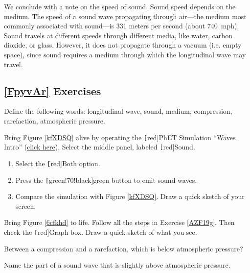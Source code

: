 \documentclass[main.tex]{subfiles}
\begin{document}
We conclude with a note on the speed of sound. Sound speed depends on the medium. The speed of a sound wave propagating through air---the medium most commonly associated with sound---is 331 meters per second (about \SI{740}{mph}). Sound travels at different speeds through different media, like water, carbon dioxide, or glass. However, it does not propagate through a vacuum (i.e. empty space), since sound requires a medium through which the longitudinal wave may travel.

\subsection*{\ref{FpyvAr} Exercises}

\begin{exercise}
    Define the following words: longitudinal wave, sound, medium, compression, rarefaction, atmospheric pressure. 
\end{exercise}

\begin{exercise} \label{AZF19g}
     Bring Figure \ref{kfXDSQ} alive by operating the \texttt[red]{PhET Simulation} ``Waves Intro'' (\href{https://phet.colorado.edu/sims/html/waves-intro/latest/waves-intro_en.html}{click here}). Select the middle panel, labeled \texttt[red]{Sound}.
    
     \begin{enumerate}
     \setlength\itemsep{0.1ex}
        \item Select the \texttt[red]{Both} option.
        \item Press the \texttt[green!70!black]{green} button to emit sound waves.
        \item Compare the simulation with Figure \ref{kfXDSQ}. Draw a quick sketch of your screen.
     \end{enumerate}
\end{exercise}

\begin{exercise}
    Bring Figure \ref{6cfkhd} to life. Follow all the steps in Exercise \ref{AZF19g}. Then check the \texttt[red]{Graph} box. Draw a quick sketch of what you see. 
\end{exercise}

\begin{exercise}
    Between a compression and a rarefaction, which is below atmospheric pressure?
\end{exercise}

\begin{exercise}
    Name the part of a sound wave that is slightly above atmospheric pressure.
\end{exercise}
\end{document}
